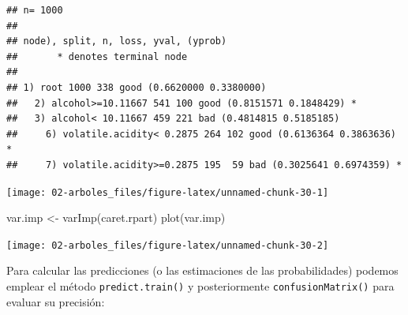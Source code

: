 \documentclass[
  spanish,
]{book}
\newenvironment{Shaded}{\begin{snugshade}}{\end{snugshade}}
\newcommand{\AttributeTok}[1]{\textcolor[rgb]{0.77,0.63,0.00}{#1}}
\newcommand{\CommentTok}[1]{\textcolor[rgb]{0.56,0.35,0.01}{\textit{#1}}}
\newcommand{\FunctionTok}[1]{\textcolor[rgb]{0.00,0.00,0.00}{#1}}
\newcommand{\NormalTok}[1]{#1}
\newcommand{\OtherTok}[1]{\textcolor[rgb]{0.56,0.35,0.01}{#1}}
\newcommand{\SpecialCharTok}[1]{\textcolor[rgb]{0.00,0.00,0.00}{#1}}
\newcommand{\StringTok}[1]{\textcolor[rgb]{0.31,0.60,0.02}{#1}}
\theoremstyle{break}
\theoremstyle{definition}
\theoremstyle{definition}
\theoremstyle{definition}
\theoremstyle{definition}
\theoremstyle{remark}
\begin{document}
\begin{verbatim}
## n= 1000 
## 
## node), split, n, loss, yval, (yprob)
##       * denotes terminal node
## 
## 1) root 1000 338 good (0.6620000 0.3380000)  
##   2) alcohol>=10.11667 541 100 good (0.8151571 0.1848429) *
##   3) alcohol< 10.11667 459 221 bad (0.4814815 0.5185185)  
##     6) volatile.acidity< 0.2875 264 102 good (0.6136364 0.3863636) *
##     7) volatile.acidity>=0.2875 195  59 bad (0.3025641 0.6974359) *
\end{verbatim}

\begin{Shaded}
\end{Shaded}

\begin{center}\texttt{[image: 02-arboles\_files/figure-latex/unnamed-chunk-30-1]} \end{center}

\begin{Shaded}
\begin{Highlighting}[]
\NormalTok{var.imp }\OtherTok{\textless{}{-}} \FunctionTok{varImp}\NormalTok{(caret.rpart)}
\FunctionTok{plot}\NormalTok{(var.imp)}
\end{Highlighting}
\end{Shaded}

\begin{center}\texttt{[image: 02-arboles\_files/figure-latex/unnamed-chunk-30-2]} \end{center}

Para calcular las predicciones (o las estimaciones de las probabilidades) podemos emplear el método \texttt{predict.train()} y posteriormente \texttt{confusionMatrix()} para evaluar su precisión:

\begin{Shaded}
\end{Shaded}
\end{document}
